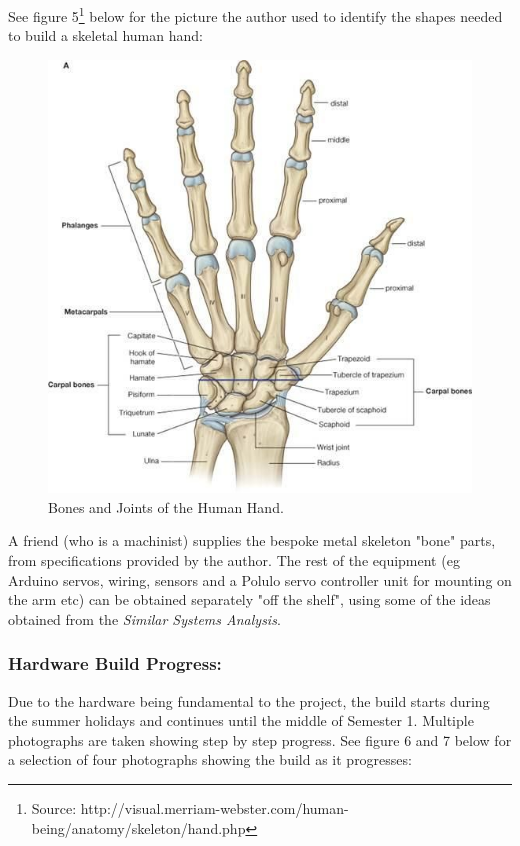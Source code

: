 \documentclass[progress]{cmpreport}
\begin{document}
See figure 5\footnote {Source: http://visual.merriam-webster.com/human-being/anatomy/skeleton/hand.php} below for the picture the author used to identify the shapes needed to build a skeletal human hand:

\begin{figure}[H] 
	\centering
	\caption{Bones and Joints of the Human Hand.} 
	\includegraphics[height=0.45\textheight, keepaspectratio]{photos/hand.jpg} 
\end{figure}

 A friend (who is a machinist) supplies the bespoke metal skeleton "bone" parts, from specifications provided by the author. The rest of the equipment (eg Arduino servos, wiring, sensors and a Polulo servo controller unit for mounting on the arm etc) can be obtained separately "off the shelf", using some of the ideas obtained from the \textit{Similar Systems Analysis}.

\subsubsection{Hardware Build Progress:}

Due to the hardware being fundamental to the project, the build starts during the summer holidays and continues until the middle of Semester 1. Multiple photographs are taken showing step by step progress. See figure 6 and 7 below for a selection of four photographs showing the build as it progresses: 
\end{document}

